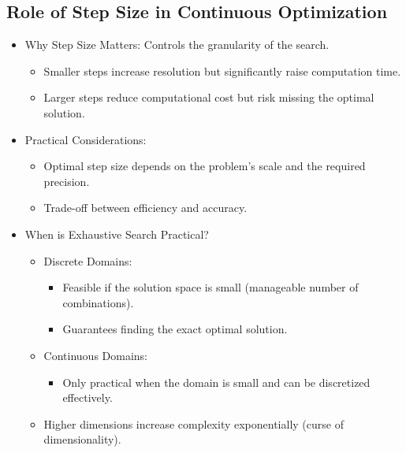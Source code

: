 \documentclass[
  letterpaper,
  DIV=11,
  numbers=noendperiod]{scrreprt}
\providecommand{\tightlist}{%
  \setlength{\itemsep}{0pt}\setlength{\parskip}{0pt}}\usepackage{longtable,booktabs,array}
\begin{document}
\subsection{Role of Step Size in Continuous
Optimization}\label{role-of-step-size-in-continuous-optimization}

\begin{itemize}
\tightlist
\item
  Why Step Size Matters: Controls the granularity of the search.

  \begin{itemize}
  \tightlist
  \item
    Smaller steps increase resolution but significantly raise
    computation time.
  \item
    Larger steps reduce computational cost but risk missing the optimal
    solution.
  \end{itemize}
\item
  Practical Considerations:

  \begin{itemize}
  \tightlist
  \item
    Optimal step size depends on the problem's scale and the required
    precision.
  \item
    Trade-off between efficiency and accuracy.
  \end{itemize}
\item
  When is Exhaustive Search Practical?

  \begin{itemize}
  \tightlist
  \item
    Discrete Domains:

    \begin{itemize}
    \tightlist
    \item
      Feasible if the solution space is small (manageable number of
      combinations).
    \item
      Guarantees finding the exact optimal solution.
    \end{itemize}
  \item
    Continuous Domains:

    \begin{itemize}
    \tightlist
    \item
      Only practical when the domain is small and can be discretized
      effectively.
    \end{itemize}
  \item
    Higher dimensions increase complexity exponentially (curse of
    dimensionality).
  \end{itemize}
\end{itemize}
\end{document}
